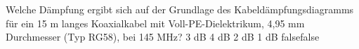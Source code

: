     {Welche Dämpfung ergibt sich auf der Grundlage des Kabeldämpfungsdiagramms für ein 15 m langes Koaxialkabel mit Voll-PE-Dielektrikum, 4,95 mm Durchmesser (Typ RG58), bei 145 MHz?}
    {3 dB}
    {4 dB}
    {2 dB}
    {1 dB}
    {false}{false}